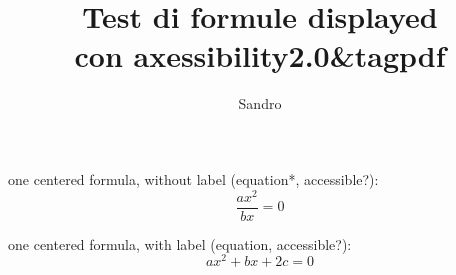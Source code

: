 \documentclass{article}
\title{Test di formule displayed\\con axessibility2.0\&tagpdf}
\author{Sandro}
\date{}
\begin{document}
\pagestyle{empty}

\maketitle


one centered formula, without label (equation*, accessible?):
\begin{equation*}
\frac{a x^2}{b x} = 0
\end{equation*}

one centered formula, with label (equation, accessible?):
\begin{equation}
a x^2 + b x + 2 c = 0
\end{equation}
\end{document}
